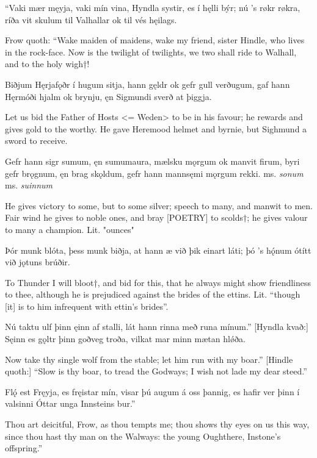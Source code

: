 “Vaki mær męyja, \hld vaki mín vina,
Hyndla systir, \hld es í hęlli býr;
nú ’s røkr røkra, \hld ríða vit skulum
til Valhallar \hld ok til vés hęilags.

Frow quoth:
“Wake maiden of maidens, wake my friend, sister Hindle, who lives in the rock-face. Now is the twilight of twilights, we two shall ride to Walhall, and to the holy wigh†!

Biðjum Hęrjafǫðr \hld í hugum sitja,
hann gęldr ok gefr \hld gull verðugum\footnotemark[1],
gaf hann Hęrmóði \hld hjalm ok brynju,
ęn Sigmundi \hld sverð at þiggja.

Let us bid the Father of Hosts <= Weden> to be in his favour; he rewards and gives gold to the worthy. He gave Heremood helmet and byrnie, but Sighmund a sword to receive.

Gefr hann sigr sumum\footnotetext[1], \hld ęn sumum\footnotetext[2] aura,
mælsku mǫrgum \hld ok manvit firum,
byri gefr brǫgnum, \hld ęn brag skǫldum,
gefr hann mannsęmi \hld mǫrgum rekki.
\footnotetext[1] ms. \emph{sonum}
\footnotetext[2] ms. \emph{suinnum}

He gives victory to some, but to some silver\footnotemark[1]; speech to many, and manwit to men. Fair wind he gives to noble ones, and bray [POETRY] to scolds†; he gives valour to many a champion.
\footnotemark[1] Lit. "ounces"

Þór munk blóta, \hld þess munk biðja,
at hann æ við þik \hld einart láti;
þó ’s hǫ́num ótítt \hld við jǫtuns brúðir.

To Thunder I will bloot†, and bid for this, that he always might show friendliness to thee, although he is prejudiced against the brides of the ettins\footnotemark[1].
\footnotetext[1] Lit. “though [it] is to him infrequent with ettin's brides”.

Nú taktu ulf þinn \hld ęinn af stalli,
lát hann rinna \hld með runa mínum.”
[Hyndla kvað:] Sęinn es gǫltr þinn \hld goðveg troða,
vilkat mar minn \hld mætan hlǿða.

Now take thy single wolf from the stable; let him run with my boar.” [Hindle quoth:] “Slow is thy boar, to tread the Godways; I wish not lade my dear steed.”

Flǫ́ est Fręyja, \hld es fręistar mín,
visar þú augum \hld á oss þannig,
es hafir ver þinn \hld í valsinni
Óttar unga \hld Innsteins bur.”

Thou art deicitful, Frow, as thou tempts me; thou shows thy eyes on us this way, since thou hast thy man on the Walways: the young Oughthere, Instone's offspring.”

